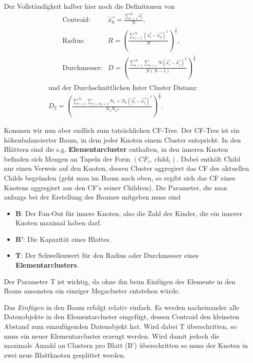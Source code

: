 Der Vollständigkeit halber hier noch die Definitionen von
\begin{align*}
&\text{Centroid:} &\vec{x_0} = \frac{\sum_{i=1}^N \vec{x_i}}{N},\\
&\text{Radius:} &R =\left( \frac{\sum_{i=1}^N \left(\vec{x_i}-\vec{x_0}
\right)^2}{N}\right)^{\frac{1}{2}},\\
&\text{Durchmesser:} &D = \left( \frac{\sum_{i=1}^N \sum_{j=1}{N} \left(\vec{x_i}-\vec{x_j}
\right)^2}{N(N-1)}\right)^{\frac{1}{2}}\\
\end{align*}
\begin{align*}
&\text{und der Durchschnittlichen Inter Cluster Distanz:} &\quad\\
 &D_2 = \left( \frac{\sum_{i=1}^{N_1} \sum_{j=N_1 +1}{N_1 + N_2} \left(\vec{x_i}-\vec{x_j}
\right)^2}{N_1 N_2)}\right)^{\frac{1}{2}}. &
\end{align*}

Kommen wir nun aber endlich zum tatsächlichen CF-Tree. Der CF-Tree ist
ein höhenbalancierter Baum, in dem jeder Knoten einem Cluster entspricht. 
In den Blättern sind die s.g. \textbf{Elementarcluster} enthalten, in den 
inneren Knoten befinden sich Mengen an Tupeln der Form \((CF_i,\ \text{
child}_i)\). Dabei enthält Child nur einen Verweis auf den Knoten, dessen 
Cluster aggregiert das CF des aktuellen Childs begründen (geht man im
Baum nach oben, so ergibt sich das CF eines Knotens aggregiert aus den
CF's seiner Children). Die Parameter, die man anfangs bei der Erstellung
des Baumes mitgeben muss sind
\begin{itemize}
\item \textbf{B}: Der Fan-Out für innere Knoten, also die Zahl der Kinder,
die ein innerer Knoten maximal haben darf.
\item \textbf{B'}: Die Kapazität eines Blattes.
\item \textbf{T}: Der Schwellenwert für den Radius oder Durchmesser
eines \textbf{Elementarclusters}.
\end{itemize}
Der Parameter T ist wichtig, da ohne ihn beim Einfügen der Elemente
in den Baum ansonsten ein einziger Megacluster entstehen würde.

Das \textit{Einfügen} in den Baum erfolgt relativ einfach. Es werden
nacheinander alle Datenobjekte in den Elementarcluster eingefügt, dessen
Centroid den kleinsten Abstand zum einzufügenden Datenobjekt hat. Wird
dabei T überschritten, so muss ein neuer Elementarcluster erzeugt werden.
Wird damit jedoch die maximale Anzahl an Clustern pro Blatt (B') überschritten
so muss der Knoten in zwei neue Blattknoten gesplittet werden.

